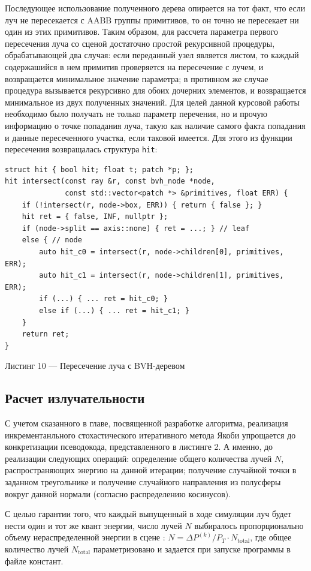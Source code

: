 \documentclass[12pt]{article}
\begin{document}
Последующее использование полученного дерева опирается на тот факт, что если луч не пересекается с AABB группы примитивов, то он точно не пересекает ни один из этих примитивов. Таким образом, для рассчета параметра первого пересечения луча со сценой достаточно простой рекурсивной процедуры, обрабатывающей два случая: если переданный узел является листом, то каждый содержашийся в нем примитив проверяется на пересечение с лучем, и возвращается минимальное значение параметра; в противном же случае процедура вызывается рекурсивно для обоих дочерних элементов, и возвращается минимальное из двух полученных значений. Для целей данной курсовой работы необходимо было получать не только параметр перечения, но и прочую информацию о точке попадания луча, такую как наличие самого факта попадания и данные пересеченного участка, если таковой имеется. Для этого из функции пересечения возвращалась структура \texttt{hit}:
\begin{lstlisting}
struct hit { bool hit; float t; patch *p; };
hit intersect(const ray &r, const bvh_node *node,
              const std::vector<patch *> &primitives, float ERR) {
    if (!intersect(r, node->box, ERR)) { return { false }; }
    hit ret = { false, INF, nullptr };
    if (node->split == axis::none) { ret = ...; } // leaf
    else { // node
        auto hit_c0 = intersect(r, node->children[0], primitives, ERR);
        auto hit_c1 = intersect(r, node->children[1], primitives, ERR);
        if (...) { ... ret = hit_c0; }
        else if (...) { ... ret = hit_c1; }
    }
    return ret;
}
\end{lstlisting}
\begin{center}Листинг 10 --- Пересечение луча с BVH-деревом \end{center}
\subsection{Расчет излучательности}
С учетом сказанного в главе, посвященной разработке алгоритма, реализация инкрементанльного стохастического итеративного метода Якоби упрощается до конкретизации псеводокода, представленного в листинге 2. А именно, до реализации следующих операций: определение общего количества лучей $N$, распространяющих энергию на данной итерации; получение случайной точки в заданном треугольнике и получение случайного направления из полусферы вокруг данной нормали (согласно распределению косинусов).

С целью гарантии того, что каждый выпущенный в ходе симуляции луч будет нести один и тот же квант энергии, число лучей $N$ выбиралось пропорционально объему нераспределенной энергии в сцене \cite{Pet06}: $N = \Delta P^{(k)} / P_T  \cdot N_{\text{total}}$, где общее количество лучей $N_{\text{total}}$ параметризовано и задается при запуске программы в файле констант.
\end{document}

